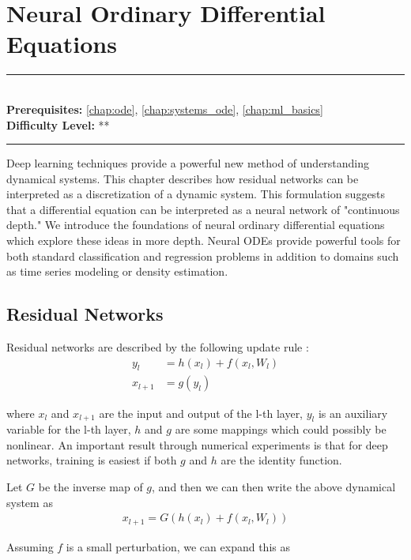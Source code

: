 \documentclass[book.tex]{subfiles}
\begin{document}
\chapter{Neural Ordinary Differential Equations}
\label{chap:neural_ode}
\noindent\rule{11cm}{0.4pt} \\
\textbf{Prerequisites:} 
\autoref{chap:ode}, \autoref{chap:systems_ode}, \autoref{chap:ml_basics}  \\
\textbf{Difficulty Level:} ** \\
\noindent\rule{11cm}{0.4pt}
\vspace{5mm}

Deep learning techniques provide a powerful new method of understanding dynamical systems. This chapter describes how residual networks can be interpreted as a discretization of a dynamic system. This formulation suggests that a differential equation can be interpreted as a neural network of "continuous depth." We introduce the foundations of neural ordinary differential equations \cite{chen2018neural} which explore these ideas in more depth. Neural ODEs provide powerful tools for both standard classification and regression problems in addition to domains such as time series modeling or density estimation.

\section{Residual Networks}

Residual networks are described by the following update rule \cite{weinan2017proposal}:
\begin{align}
y_l &= h(x_l)+f(x_l,W_l) \\
x_{l+1} &= g(y_l)
\end{align}

where $x_l$ and $x_{l+1}$ are the input and output of the l-th layer, $y_l$ is an auxiliary variable for the l-th layer, $h$ and $g$ are some mappings which could possibly be nonlinear.  An important result through numerical experiments \cite{he2016identity} is that for deep networks, training is easiest if both $g$ and $h$ are the identity function. 

Let $G$ be the inverse map of $g$, and then we can then write the above dynamical system as
\begin{align}
x_{l+1} = G(h(x_l)+f(x_l,W_l))
\end{align}

Assuming $f$ is a small perturbation, we can expand this as
\end{document}
